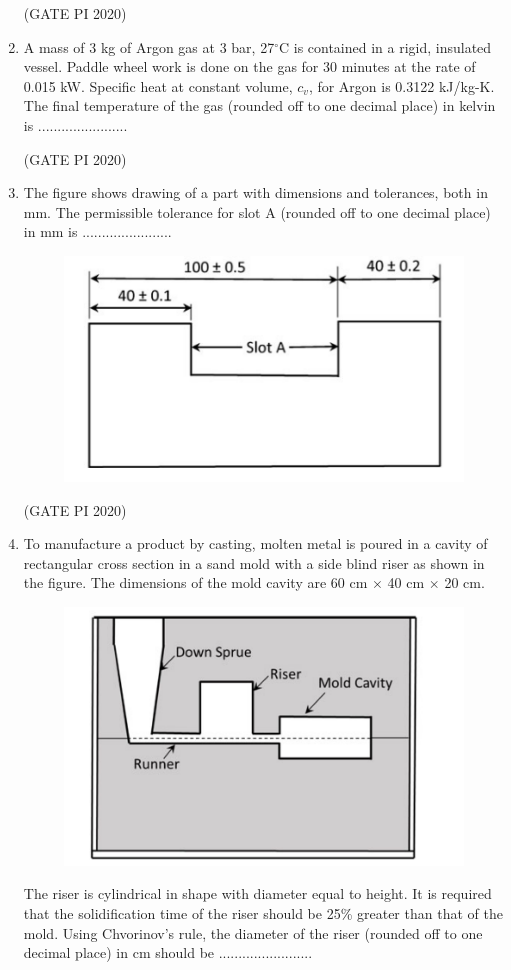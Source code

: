 \documentclass[journal,12pt,onecolumn]{IEEEtran}
\theoremstyle{remark}
\begin{document}
\begin{enumerate}
\hfill (GATE PI 2020)

\item A mass of 3 kg of Argon gas at 3 bar, 27$^\circ$C is contained in a rigid, insulated vessel. Paddle wheel work is done on the gas for 30 minutes at the rate of 0.015 kW. Specific heat at constant volume, $c_v$, for Argon is 0.3122 kJ/kg-K. The final temperature of the gas (rounded off to one decimal place) in kelvin is ....................... 

\hfill (GATE PI 2020)

\item The figure shows drawing of a part with dimensions and tolerances, both in mm. The permissible tolerance for slot A (rounded off to one decimal place) in mm is ....................... 
\begin{figure}[h]
    \centering
    \includegraphics[width=0.5\columnwidth]{figs/fig15.png}
    \caption{}
    \label{fig:placeholder}
\end{figure}

\hfill (GATE PI 2020)

\item To manufacture a product by casting, molten metal is poured in a cavity of rectangular cross section in a sand mold with a side blind riser as shown in the figure. The dimensions of the mold cavity are 60 cm $\times$ 40 cm $\times$ 20 cm.

\begin{figure}[h]
    \centering
    \includegraphics[width=0.5\columnwidth]{figs/fig16.png}
    \caption{}
    \label{fig:placeholder}
\end{figure}

The riser is cylindrical in shape with diameter equal to height. It is required that the solidification time of the riser should be 25\% greater than that of the mold. Using Chvorinov's rule, the diameter of the riser (rounded off to one decimal place) in cm should be ........................


\end{enumerate}
\end{document}
